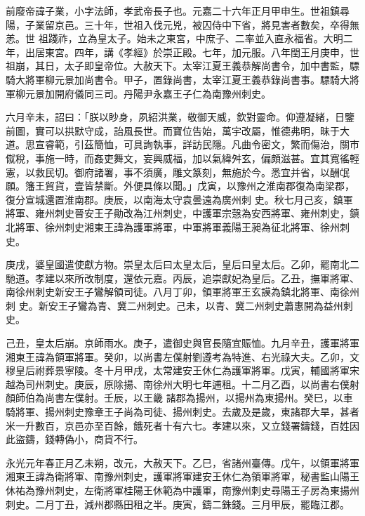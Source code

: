 
\begin{pinyinscope}

 前廢帝諱子業，小字法師，孝武帝長子也。元嘉二十六年正月甲申生。世祖鎮尋陽，子業留京邑。三十年，世祖入伐元兇，被囚侍中下省，將見害者數矣，卒得無恙。世
 祖踐祚，立為皇太子。始未之東宮，中庶子、二率並入直永福省。大明二年，出居東宮。四年，講《孝經》於崇正殿。七年，加元服。八年閏王月庚申，世祖崩，其日，太子即皇帝位。大赦天下。太宰江夏王義恭解尚書令，加中書監，驃騎大將軍柳元景加尚書令。甲子，置錄尚書，太宰江夏王義恭錄尚書事。驃騎大將軍柳元景加開府儀同三司。丹陽尹永嘉王子仁為南豫州刺史。



 六月辛未，詔曰：「朕以眇身，夙紹洪業，敬御天威，欽對靈命。仰遵凝緒，日鑒
 前圖，實可以拱默守成，詒風長世。而寶位告始，萬宇改屬，惟德弗明，昧于大道。思宣睿範，引茲簡恤，可具詢執事，詳訪民隱。凡曲令密文，繁而傷治，關市僦稅，事施一時，而姦吏舞文，妄興威福，加以氣緯舛玄，偏頗滋甚。宜其寬徭輕憲，以救民切。御府諸署，事不須廣，雕文篆刻，無施於今。悉宜并省，以酬氓願。籓王貿貨，壹皆禁斷。外便具條以聞。」戊寅，以豫州之淮南郡復為南梁郡，復分宣城還置淮南郡。庚辰，以南海太守袁曇遠為廣州刺
 史。秋七月己亥，鎮軍將軍、雍州刺史晉安王子勛改為江州刺史，中護軍宗愨為安西將軍、雍州刺史，鎮北將軍、徐州刺史湘東王諱為護軍將軍，中軍將軍義陽王昶為征北將軍、徐州刺史。



 庚戌，婆皇國遣使獻方物。崇皇太后曰太皇太后，皇后曰皇太后。乙卯，罷南北二馳道。孝建以來所改制度，還依元嘉。丙辰，追崇獻妃為皇后。乙丑，撫軍將軍、南徐州刺史新安王子鸞解領司徒。八月丁卯，領軍將軍王玄謨為鎮北將軍、南徐州刺
 史。新安王子鸞為青、冀二州刺史。己未，以青、冀二州刺史蕭惠開為益州刺史。



 己丑，皇太后崩。京師雨水。庚子，遣御史與官長隨宜賑恤。九月辛丑，護軍將軍湘東王諱為領軍將軍。癸卯，以尚書左僕射劉遵考為特進、右光祿大夫。乙卯，文穆皇后祔葬景寧陵。冬十月甲戌，太常建安王休仁為護軍將軍。戊寅，輔國將軍宋越為司州刺史。庚辰，原除揚、南徐州大明七年逋租。十二月乙酉，以尚書右僕射顏師伯為尚書左僕射。壬辰，以王畿
 諸郡為揚州，以揚州為東揚州。癸巳，以車騎將軍、揚州刺史豫章王子尚為司徒、揚州刺史。去歲及是歲，東諸郡大旱，甚者米一升數百，京邑亦至百餘，餓死者十有六七。孝建以來，又立錢署鑄錢，百姓因此盜鑄，錢轉偽小，商貨不行。



 永光元年春正月乙未朔，改元，大赦天下。乙巳，省諸州臺傳。戊午，以領軍將軍湘東王諱為衛將軍、南豫州刺史，護軍將軍建安王休仁為領軍將軍，秘書監山陽王
 休祐為豫州刺史，左衛將軍桂陽王休範為中護軍，南豫州刺史尋陽王子房為東揚州刺史。二月丁丑，減州郡縣田租之半。庚寅，鑄二銖錢。三月甲辰，罷臨江郡。




\end{pinyinscope}
